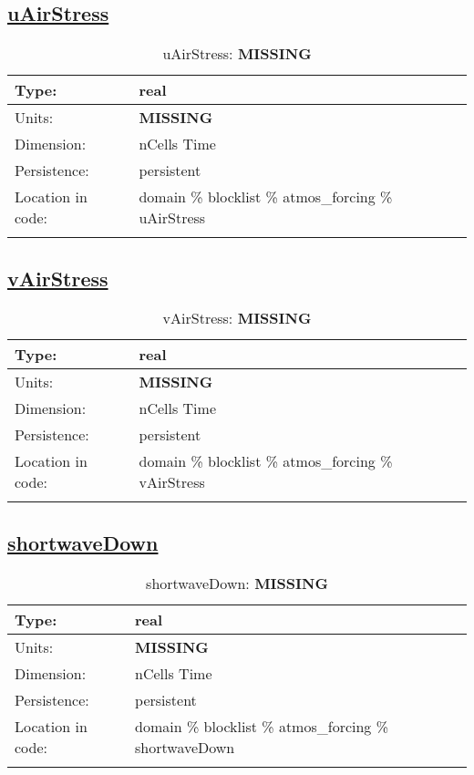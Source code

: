 \subsection[uAirStress]{\hyperref[sec:var_tab_atmos_forcing]{uAirStress}}
\label{subsec:var_sec_atmos_forcing_uAirStress}
\begin{center}
\begin{longtable}{| p{2.0in} | p{4.0in} |}
        \hline 
        Type: & real \\
        \hline 
        Units: & {\bf \color{red} MISSING} \\
        \hline 
        Dimension: & nCells Time \\
        \hline 
        Persistence: & persistent \\
        \hline 
         Location in code: & domain \% blocklist \% atmos\_forcing \% uAirStress \\
         \hline 
    \caption{uAirStress: {\bf \color{red} MISSING}}
\end{longtable}
\end{center}
\subsection[vAirStress]{\hyperref[sec:var_tab_atmos_forcing]{vAirStress}}
\label{subsec:var_sec_atmos_forcing_vAirStress}
\begin{center}
\begin{longtable}{| p{2.0in} | p{4.0in} |}
        \hline 
        Type: & real \\
        \hline 
        Units: & {\bf \color{red} MISSING} \\
        \hline 
        Dimension: & nCells Time \\
        \hline 
        Persistence: & persistent \\
        \hline 
         Location in code: & domain \% blocklist \% atmos\_forcing \% vAirStress \\
         \hline 
    \caption{vAirStress: {\bf \color{red} MISSING}}
\end{longtable}
\end{center}
\subsection[shortwaveDown]{\hyperref[sec:var_tab_atmos_forcing]{shortwaveDown}}
\label{subsec:var_sec_atmos_forcing_shortwaveDown}
\begin{center}
\begin{longtable}{| p{2.0in} | p{4.0in} |}
        \hline 
        Type: & real \\
        \hline 
        Units: & {\bf \color{red} MISSING} \\
        \hline 
        Dimension: & nCells Time \\
        \hline 
        Persistence: & persistent \\
        \hline 
         Location in code: & domain \% blocklist \% atmos\_forcing \% shortwaveDown \\
         \hline 
    \caption{shortwaveDown: {\bf \color{red} MISSING}}
\end{longtable}
\end{center}
